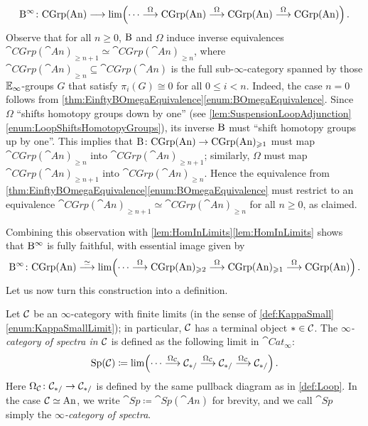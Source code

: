 \begin{con}
	\begin{equation*}
		\B^\infty\colon \cat{CGrp}(\cat{An})\longrightarrow \limit\left(\dotsb\overset{\Omega}{\longrightarrow} \cat{CGrp}(\cat{An})\overset{\Omega}{\longrightarrow} \cat{CGrp}(\cat{An})\overset{\Omega}{\longrightarrow} \cat{CGrp}(\cat{An})\right)\,.
	\end{equation*}
	Observe that for all $n\geqslant 0$, $\mathrm{B}$ and $\Omega$ induce inverse equivalences $\cat{CGrp}(\cat{An})_{\geqslant n+1}\simeq \cat{CGrp}(\cat{An})_{\geqslant n}$, where $\cat{CGrp}(\cat{An})_{\geqslant n}\subseteq \cat{CGrp}(\cat{An})$ is the full sub-$\infty$-category spanned by those $\mathbb{E}_\infty$-groups $G$ that satisfy $\pi_i(G)\cong0$ for all $0\leqslant i<n$. Indeed, the case $n=0$ follows from \cref{thm:EinftyBOmegaEquivalence}\cref{enum:BOmegaEquivalence}. Since $\Omega$ \enquote{shifts homotopy groups down by one} (see \cref{lem:SuspensionLoopAdjunction}\cref{enum:LoopShiftsHomotopyGroups}), its inverse $\mathrm{B}$ must \enquote{shift homotopy groups up by one}. This implies that $\mathrm{B}\colon \mathrm{CGrp}(\mathrm{An})\rightarrow \mathrm{CGrp}(\mathrm{An})_{\geqslant 1}$ must map $\cat{CGrp}(\cat{An})_{\geqslant n}$ into $\cat{CGrp}(\cat{An})_{\geqslant n+1}$; similarly, $\Omega$ must map $\cat{CGrp}(\cat{An})_{\geqslant n+1}$ into $\cat{CGrp}(\cat{An})_{\geqslant n}$. Hence the equivalence from \cref{thm:EinftyBOmegaEquivalence}\cref{enum:BOmegaEquivalence} must restrict to an equivalence $\cat{CGrp}(\cat{An})_{\geqslant n+1}\simeq \cat{CGrp}(\cat{An})_{\geqslant n}$ for all $n\geqslant 0$, as claimed.
	
	Combining this observation with \cref{lem:HomInLimits}\cref{lem:HomInLimits} shows that $\mathrm{B}^\infty$ is fully faithful, with essential image given by
	\begin{equation*}
		\B^\infty\colon \cat{CGrp}(\cat{An})\overset{\simeq}{\longrightarrow}\limit\left(\dotsb\overset{\Omega}{\longrightarrow} \cat{CGrp}(\cat{An})_{\geqslant 2}\overset{\Omega}{\longrightarrow} \cat{CGrp}(\cat{An})_{\geqslant 1}\overset{\Omega}{\longrightarrow} \cat{CGrp}(\cat{An})\right)\,.
	\end{equation*}
	Let us now turn this construction into a definition.
\end{con}
\begin{defi}\label{def:Spectra}
	Let $\mathcal{C}$ be an $\infty$-category with finite limits (in the sense of \cref{def:KappaSmall}\cref{enum:KappaSmallLimit}); in particular, $\mathcal{C}$ has a terminal object $*\in\mathcal{C}$. The \emph{$\infty$-category of spectra in $\mathcal{C}$} is defined as the following limit in $\cat{Cat}_\infty$:
	\begin{equation*}
		\cat{Sp}(\Cc)\coloneqq \limit\left(\dotsb\overset{\Omega_\Cc}{\longrightarrow} \Cc_{*/}\overset{\Omega_\Cc}{\longrightarrow} \Cc_{*/}\overset{\Omega_\Cc}{\longrightarrow} \Cc_{*/}\right)\,.
	\end{equation*}
	Here $\Omega_{\mathcal{C}}\colon \mathcal{C}_{*/}\rightarrow \mathcal{C}_{*/}$ is defined by the same pullback diagram as in \cref{def:Loop}. In the case $\mathcal{C}\simeq \mathrm{An}$, we write $\cat{Sp}\coloneqq \cat{Sp}(\cat{An})$ for brevity, and we call $\cat{Sp}$ simply the \emph{$\infty$-category of spectra}.
\end{defi}
